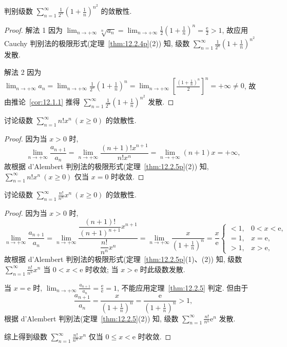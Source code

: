 \begin{example}\label{ex:12.2.9}
判别级数 $\sum_{n=1}^{\infty}\frac{1}{2^{n}}\left(1+\frac{1}{n}\right)^{n^{2}}$ 的敛散性.
\end{example}

\begin{proof}
解法 1 因为 $\lim_{n\to+\infty}\sqrt[n]{a_{n}}=\lim_{n\to+\infty}\frac{1}{2}\left(1+\frac{1}{n}\right)^{n}=\frac{\mathrm{e}}{2}>1$, 故应用 Cauchy 判别法的极限形式(定理~\ref{thm:12.2.4p}(2)) 知, 级数 $\sum_{n=1}^{\infty}\frac{1}{2^{n}}\left(1+\frac{1}{n}\right)^{n^{2}}$ 发散.

解法 2 因为 $\lim_{n\to+\infty}a_{n}=\lim_{n\to+\infty}\frac{1}{2^{n}}\left(1+\frac{1}{n}\right)^{n}=\lim_{n\to+\infty}\left[\frac{(1+\frac{1}{n})^{n}}{2}\right]^{n}=+\infty\neq0$, 故由推论~\ref{cor:12.1.1} 推得 $\sum_{n=1}^{\infty}\frac{1}{2^{n}}\left(1+\frac{1}{n}\right)^{n^{2}}$ 发散.
\end{proof}

\begin{example}\label{ex:12.2.10}
讨论级数 $\sum_{n=1}^{\infty}n!x^{n}\ (x\geqslant0)$ 的敛散性.
\end{example}

\begin{proof}
因为当 $x>0$ 时,
\[
  \lim_{n\to+\infty}\frac{a_{n+1}}{a_{n}}
  =\lim_{n\to+\infty}\frac{(n+1)!x^{n+1}}{n!x^{n}}
  =\lim_{n\to+\infty}(n+1)x=+\infty,
\]
故根据 d'Alembert 判别法的极限形式(定理~\ref{thm:12.2.5p}(2)) 知, $\sum_{n=1}^{\infty}n!x^{n}\ (x\geqslant0)$ 仅当 $x=0$ 时收敛.
\end{proof}

\begin{example}\label{ex:12.2.11}
讨论级数 $\sum_{n=1}^{\infty}\frac{n!}{n^{n}}x^{n}\ (x\geqslant0)$ 的敛散性.
\end{example}

\begin{proof}
因为当 $x>0$ 时,
\[
  \lim_{n\to+\infty}\frac{a_{n+1}}{a_{n}}
  =\lim_{n\to+\infty}
  \frac{\dfrac{(n+1)!}{(n+1)^{n+1}}x^{n+1}}{\dfrac{n!}{n^{n}}x^{n}}
  =\lim_{n\to+\infty}\frac{x}{\left(1+\frac{1}{n}\right)^{n}}
  =\frac{x}{\mathrm{e}}
  \begin{cases}
  <1, & 0<x<\mathrm{e},\\
  =1, & x=\mathrm{e},\\
  >1, & x>\mathrm{e},
\end{cases}
\]
故根据 d'Alembert 判别法的极限形式(定理~\ref{thm:12.2.5p}(1)、(2)) 知, 级数 $\sum_{n=1}^{\infty}\frac{n!}{n^{n}}x^{n}$ 当 $0<x<\mathrm{e}$ 时收敛; 当 $x>\mathrm{e}$ 时此级数发散.

当 $x=\mathrm{e}$ 时, $\lim_{n\to+\infty}\frac{a_{n+1}}{a_{n}}=\frac{\mathrm{e}}{\mathrm{e}}=1$, 不能应用定理~\ref{thm:12.2.5} 判定. 但由于
\[
  \frac{a_{n+1}}{a_{n}}=\frac{x}{\left(1+\frac{1}{n}\right)^{n}}=\frac{\mathrm{e}}{\left(1+\frac{1}{n}\right)^{n}}>1,
\]
根据 d'Alembert 判别法(定理~\ref{thm:12.2.5}(2)) 知, 级数 $\sum_{n=1}^{\infty}\frac{n!}{n^{n}}\mathrm{e}^{n}$ 发散.

综上得到级数 $\sum_{n=1}^{\infty}\frac{n!}{n^{n}}x^{n}$ 仅当 $0\leqslant x<\mathrm{e}$ 时收敛.
\end{proof}

